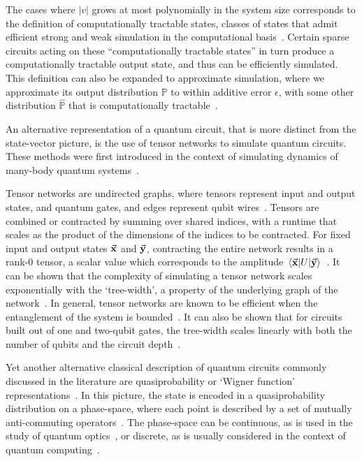 The cases where $\left|v\right|$ grows at most polynomially in the system size corresponds to the definition of computationally tractable states, classes of states that admit efficient strong and weak simulation in the computational basis~\cite{VandenNest2009}. Certain sparse circuits acting on these ``computationally tractable states'' in turn produce a computationally tractable output state, and thus can be efficiently simulated. This definition can also be expanded to approximate simulation, where we approximate its output distribution $\mathbb{P}$ to within additive error $\epsilon$, with some other distribution $\mathbb{\hat{P}}$ that is computationally tractable~\cite{Schwarz2013}.\par
An alternative representation of a quantum circuit, that is more distinct from the state-vector picture, is the use of tensor networks to simulate quantum circuits. These methods were first introduced in the context of simulating dynamics of many-body quantum systems~\cite{Vidal2003}.\par
Tensor networks are undirected graphs, where tensors represent input and output states, and quantum gates, and edges represent qubit wires~\cite{Markov2005}. Tensors are combined or contracted by summing over shared indices, with a runtime that scales as the product of the dimensions of the indices to be contracted. For fixed input and output states $\va{x}$ and $\va{y}$, contracting the entire network results in a rank-0 tensor, a scalar value which corresponds to the amplitude $\matrixel{\va{x}}{U}{\va{y}}$~\cite{Markov2005}. It can be shown that the complexity of simulating a tensor network scales exponentially with the `tree-width', a property of the underlying graph of the network~\cite{Markov2005}. In general, tensor networks are known to be efficient when the entanglement of the system is bounded~\cite{Vidal2003}. It can also be shown that for circuits built out of one and two-qubit gates, the tree-width scales linearly with both the number of qubits and the circuit depth~\cite{Markov2005}.\par
Yet another alternative classical description of quantum circuits commonly discussed in the literature are quasiprobability or `Wigner function' representations~\cite{Wootters1987}. In this picture, the state is encoded in a quasiprobability distribution on a phase-space, where each point is described by a set of mutually anti-commuting operators~\cite{Wootters1987}. The phase-space can be continuous, as is used in the study of quantum optics~\cite{Nielsen2000}, or discrete, as is usually considered in the context of quantum computing~\cite{Gross2006}.\par
